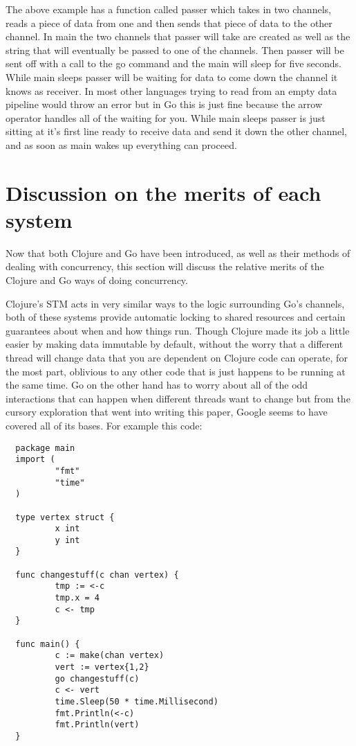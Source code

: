 \documentclass{acm_proc_article-sp}
\begin{document}
		The above example has a function called passer which takes in two channels, reads a piece of data from one and then sends that piece of data to the other channel. In main the two channels that passer will take are created as well as the string that will eventually be passed to one of the channels. Then passer will be sent off with a call to the go command and the main will sleep for five seconds. While main sleeps passer will be waiting for data to come down the channel it knows as receiver. In most other languages trying to read from an empty data pipeline would throw an error but in Go this is just fine because the arrow operator handles all of the waiting for you. While main sleeps passer is just sitting at it's first line ready to receive data and send it down the other channel, and as soon as main wakes up everything can proceed.
		
\section{Discussion on the merits of each system}
	Now that both Clojure and Go have been introduced, as well as their methods of dealing with concurrency, this section will discuss the relative merits of the Clojure and Go ways of doing concurrency.
	
	Clojure's STM acts in very similar ways to the logic surrounding Go's channels, both of these systems provide automatic locking to shared resources and certain guarantees about when and how things run. Though Clojure made its job a little easier by making data immutable by default, without the worry that a different thread will change data that you are dependent on Clojure code can operate, for the most part, oblivious to any other code that is just happens to be running at the same time. Go on the other hand has to worry about all of the odd interactions that can happen when different threads want to change but from the cursory exploration that went into writing this paper, Google seems to have covered all of its bases. For example this code:
	
	\begin{verbatim}
  package main
  import (
          "fmt"
          "time"
  )
  
  type vertex struct {
          x int
          y int
  }
  
  func changestuff(c chan vertex) {
          tmp := <-c
          tmp.x = 4
          c <- tmp
  }
  
  func main() {
          c := make(chan vertex)
          vert := vertex{1,2}
          go changestuff(c)
          c <- vert
          time.Sleep(50 * time.Millisecond)
          fmt.Println(<-c)
          fmt.Println(vert)
  }
	\end{verbatim}
	
\end{document}
